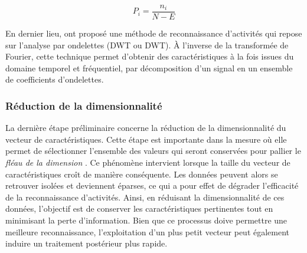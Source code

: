 \begin{equation}
	\label{eq:pi}
	 P_i = \frac{n_i}{N - E}
\end{equation}

En dernier lieu, \cite{Mitchell2013} ont proposé une méthode de reconnaissance d'activités qui repose sur l'analyse par ondelettes (\acl{DWT} ou \acs{DWT}). À l'inverse de la transformée de Fourier, cette technique permet d'obtenir des caractéristiques à la fois issues du domaine temporel et fréquentiel, par décomposition d'un signal en un ensemble de coefficients d'ondelettes.

\subsubsection{Réduction de la dimensionnalité}

La dernière étape préliminaire concerne la réduction de la dimensionnalité du vecteur de caractéristiques. Cette étape est importante dans la mesure où elle permet de sélectionner l'ensemble des valeurs qui seront conservées pour pallier le \textit{fléau de la dimension} \citep{Bellman1957}. Ce phénomène intervient lorsque la taille du vecteur de caractéristiques croît de manière conséquente. Les données peuvent alors se retrouver isolées et deviennent éparses, ce qui a pour effet de dégrader l'efficacité de la reconnaissance d'activités. Ainsi, en réduisant la dimensionnalité de ces données, l'objectif est de conserver les caractéristiques pertinentes tout en minimisant la perte d'information. Bien que ce processus doive permettre une meilleure reconnaissance, l'exploitation d'un plus petit vecteur peut également induire un traitement postérieur plus rapide.

